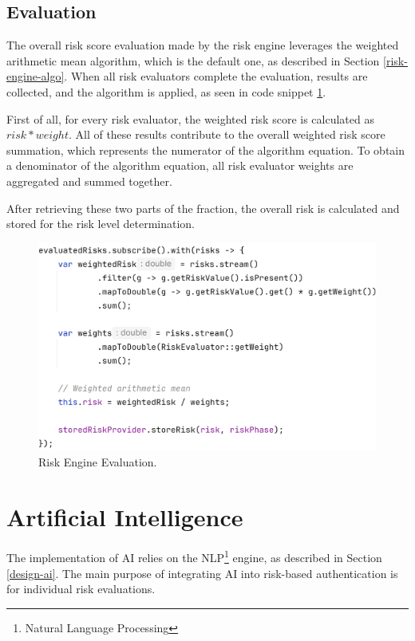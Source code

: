 \subsection{Evaluation} \label{impl-engine-evaluation}
The overall risk score evaluation made by the risk engine leverages the weighted arithmetic mean algorithm, which is the default one, as described in Section \ref{risk-engine-algo}.
When all risk evaluators complete the evaluation, results are collected, and the algorithm is applied, as seen in code snippet \ref{fig:impl-risk-engine-evaluation}.

First of all, for every risk evaluator, the weighted risk score is calculated as \( risk * weight \).
All of these results contribute to the overall weighted risk score summation, which represents the numerator of the algorithm equation.
To obtain a denominator of the algorithm equation, all risk evaluator weights are aggregated and summed together.

After retrieving these two parts of the fraction, the overall risk is calculated and stored for the risk level determination. 

\begin{figure}[htbp]
  \centering
  \includegraphics[width=1\textwidth]{img/sections/6-implementation/risk-engine-evaluation.png}
  \caption{Risk Engine Evaluation.}
  \label{fig:impl-risk-engine-evaluation}
\end{figure}

\newpage
\section{Artificial Intelligence}
The implementation of AI relies on the NLP\footnote{Natural Language Processing} engine, as described in Section \ref{design-ai}.
The main purpose of integrating AI into risk-based authentication is for individual risk evaluations.

